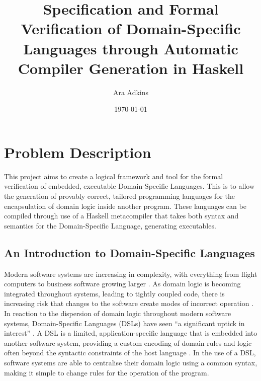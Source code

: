 \documentclass[a4paper,11pt]{report}
\title{Specification and Formal Verification of Domain-Specific Languages through Automatic Compiler Generation in Haskell}
\author{Ara Adkins}
\date{\today}
\begin{document}
\maketitle

\tableofcontents

\printglossaries

\chapter{Problem Description} %
\label{cha:problem_description}
This project aims to create a logical framework and tool for the formal verification of embedded, executable Domain-Specific Languages.
This is to allow the generation of provably correct, tailored programming languages for the encapsulation of domain logic inside another program.
These languages can be compiled through use of a Haskell metacompiler that takes both syntax and semantics for the Domain-Specific Language, generating executables. 

\section{An Introduction to Domain-Specific Languages} %
\label{sec:an_introduction_to_domain_specific_languages}
Modern software systems are increasing in complexity, with everything from flight computers to business software growing larger \citep{dvorak2009nasa}.
As domain logic is becoming integrated throughout systems, leading to tightly coupled code, there is increasing risk that changes to the software create modes of incorrect operation \cite{khawar2001developing}.\\

In reaction to the dispersion of domain logic throughout modern software systems, Domain-Specific Languages (DSLs) have seen ``a significant uptick in interest'' \citep{fowler2010domain}. 
A DSL is a limited, application-specific language that is embedded into another software system, providing a custom encoding of domain rules and logic often beyond the syntactic constraints of the host language \citep{Mernik:2005:DDL:1118890.1118892}.
In the use of a DSL, software systems are able to centralise their domain logic using a common syntax, making it simple to change rules for the operation of the program.\\
\end{document}
